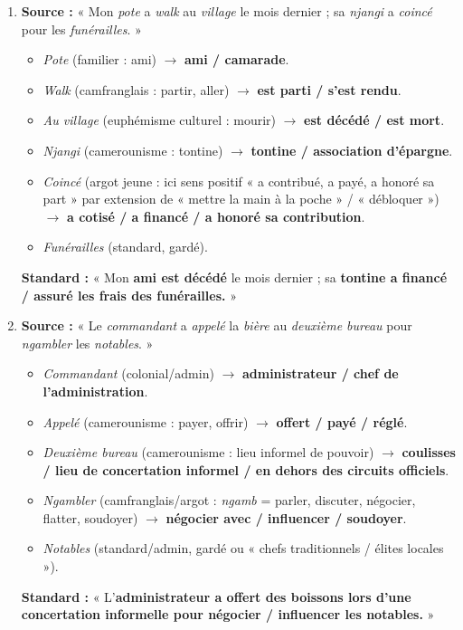 \documentclass[11pt]{article}
\begin{document}
\begin{corrige}
\begin{enumerate}
    \item \textbf{Source :} « Mon \emph{pote} a \emph{walk} au \emph{village} le mois dernier ; sa \emph{njangi} a \emph{coincé} pour les \emph{funérailles}. »
    \begin{itemize}
        \item \emph{Pote} (familier : ami) $\to$ \textbf{ami / camarade}.
        \item \emph{Walk} (camfranglais : partir, aller) $\to$ \textbf{est parti / s'est rendu}.
        \item \emph{Au village} (euphémisme culturel : mourir) $\to$ \textbf{est décédé / est mort}.
        \item \emph{Njangi} (camerounisme : tontine) $\to$ \textbf{tontine / association d'épargne}.
        \item \emph{Coincé} (argot jeune : ici sens positif « a contribué, a payé, a honoré sa part » par extension de « mettre la main à la poche » / « débloquer ») $\to$ \textbf{a cotisé / a financé / a honoré sa contribution}.
        \item \emph{Funérailles} (standard, gardé).
    \end{itemize}
    \textbf{Standard :} « Mon \textbf{ami est décédé} le mois dernier ; sa \textbf{tontine a financé / assuré les frais des funérailles.} »

    \item \textbf{Source :} « Le \emph{commandant} a \emph{appelé} la \emph{bière} au \emph{deuxième bureau} pour \emph{ngambler} les \emph{notables}. »
    \begin{itemize}
        \item \emph{Commandant} (colonial/admin) $\to$ \textbf{administrateur / chef de l'administration}.
        \item \emph{Appelé} (camerounisme : payer, offrir) $\to$ \textbf{offert / payé / réglé}.
        \item \emph{Deuxième bureau} (camerounisme : lieu informel de pouvoir) $\to$ \textbf{coulisses / lieu de concertation informel / en dehors des circuits officiels}.
        \item \emph{Ngambler} (camfranglais/argot : \emph{ngamb} = parler, discuter, négocier, flatter, soudoyer) $\to$ \textbf{négocier avec / influencer / soudoyer}.
        \item \emph{Notables} (standard/admin, gardé ou « chefs traditionnels / élites locales »).
    \end{itemize}
    \textbf{Standard :} « L'\textbf{administrateur a offert des boissons lors d'une concertation informelle pour \textbf{négocier / influencer les notables.}} »


\end{enumerate}
\end{corrige}
\end{document}

